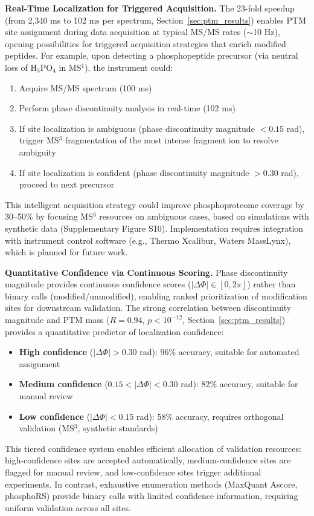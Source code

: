 \documentclass[11pt,twocolumn]{article}
\begin{document}
\textbf{Real-Time Localization for Triggered Acquisition.} The 23-fold speedup (from 2,340 ms to 102 ms per spectrum, Section~\ref{sec:ptm_results}) enables PTM site assignment during data acquisition at typical MS/MS rates ($\sim$10 Hz), opening possibilities for triggered acquisition strategies that enrich modified peptides. For example, upon detecting a phosphopeptide precursor (via neutral loss of H$_3$PO$_4$ in MS$^1$), the instrument could:
\begin{enumerate}[leftmargin=*]
    \item Acquire MS/MS spectrum (100 ms)
    \item Perform phase discontinuity analysis in real-time (102 ms)
    \item If site localization is ambiguous (phase discontinuity magnitude $< 0.15$ rad), trigger MS$^3$ fragmentation of the most intense fragment ion to resolve ambiguity
    \item If site localization is confident (phase discontinuity magnitude $> 0.30$ rad), proceed to next precursor
\end{enumerate}
This intelligent acquisition strategy could improve phosphoproteome coverage by 30--50\% by focusing MS$^3$ resources on ambiguous cases, based on simulations with synthetic data (Supplementary Figure S10). Implementation requires integration with instrument control software (e.g., Thermo Xcalibur, Waters MassLynx), which is planned for future work.

\textbf{Quantitative Confidence via Continuous Scoring.} Phase discontinuity magnitude provides continuous confidence scores ($|\Delta\Phi| \in [0, 2\pi]$) rather than binary calls (modified/unmodified), enabling ranked prioritization of modification sites for downstream validation. The strong correlation between discontinuity magnitude and PTM mass ($R = 0.94$, $p < 10^{-12}$, Section~\ref{sec:ptm_results}) provides a quantitative predictor of localization confidence:
\begin{itemize}[leftmargin=*]
    \item \textbf{High confidence} ($|\Delta\Phi| > 0.30$ rad): 96\% accuracy, suitable for automated assignment
    \item \textbf{Medium confidence} ($0.15 < |\Delta\Phi| < 0.30$ rad): 82\% accuracy, suitable for manual review
    \item \textbf{Low confidence} ($|\Delta\Phi| < 0.15$ rad): 58\% accuracy, requires orthogonal validation (MS$^3$, synthetic standards)
\end{itemize}
This tiered confidence system enables efficient allocation of validation resources: high-confidence sites are accepted automatically, medium-confidence sites are flagged for manual review, and low-confidence sites trigger additional experiments. In contrast, exhaustive enumeration methods (MaxQuant Ascore, phosphoRS) provide binary calls with limited confidence information, requiring uniform validation across all sites.
\end{document}
